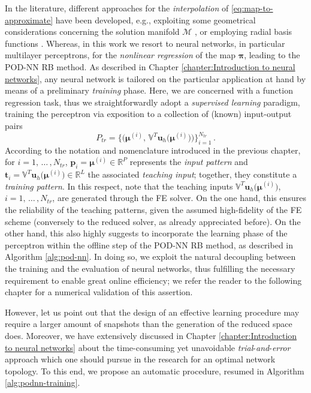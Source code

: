 \documentclass[12pt, a4paper, twoside, openright]{report}
\numberwithin{equation}{chapter}
\theoremstyle{theorem}
\theoremstyle{definition}
\theoremstyle{remark}
\theoremstyle{proposition}
\numberwithin{figure}{chapter}
\newcommand{\bg}[1]{\boldsymbol{#1}}
\begin{document}
		In the literature, different approaches for the \emph{interpolation} of \eqref{eq:map-to-approximate} have been developed, e.g., exploiting some geometrical considerations concerning the solution manifold $\mathcal{M}$ \cite{Ams10}, or employing radial basis functions \cite{Chen17}. Whereas, in this work we resort to neural networks, in particular multilayer perceptrons, for the \emph{nonlinear regression} of the map $\bg{\pi}$, leading to the POD-NN RB method. As described in Chapter \ref{chapter:Introduction to neural networks}, any neural network is tailored on the particular application at hand by means of a preliminary \emph{training} phase. Here, we are concerned with a function regression task, thus we straightforwardly adopt a \emph{supervised learning} paradigm, training the perceptron via exposition to a collection of (known) input-output pairs
		\begin{equation*}
			P_{tr} = \big\lbrace \big( \bg{\mu}^{(i)}, \, \mathbb{V}^T \mathbf{u}_h \big( \bg{\mu}^{(i)} \big) \big) \big\rbrace_{i = 1}^{N_{tr}} \, .
		\end{equation*} 
		According to the notation and nomenclature introduced in the previous chapter, for $i = 1, \, \ldots \, , N_{tr}$, $\mathbf{p}_i = \bg{\mu}^{(i)} \in \mathbb{R}^P$ represents the \emph{input pattern} and $\mathbf{t}_i =  \mathbb{V}^T \mathbf{u}_h \big( \bg{\mu}^{(i)} \big) \in \mathbb{R}^L$ the associated \emph{teaching input}; together, they constitute a \emph{training pattern}. In this respect, note that the teaching inputs $\mathbb{V}^T \mathbf{u}_h \big( \bg{\mu}^{(i)} \big)$, $i = 1, \, \ldots \, , N_{tr}$, are generated through the FE solver. On the one hand, this ensures the reliability of the teaching patterns, given the assumed high-fidelity of the FE scheme (conversely to the reduced solver, as already appreciated before). On the other hand, this also highly suggests to incorporate the learning phase of the perceptron within the offline step of the POD-NN RB method, as described in Algorithm \ref{alg:pod-nn}. In doing so, we exploit the natural decoupling between the training and the evaluation of neural networks, thus fulfilling the necessary requirement to enable great online efficiency; we refer the reader to the following chapter for a numerical validation of this assertion. 
		
		However, let us point out that the design of an effective learning procedure may require a larger amount of snapshots than the generation of the reduced space does. Moreover, we have extensively discussed in Chapter \ref{chapter:Introduction to neural networks} about the time-consuming yet unavoidable \emph{trial}-\emph{and}-\emph{error} approach which one should pursue in the research for an optimal network topology. To this end, we propose an automatic procedure, resumed in Algorithm \ref{alg:podnn-training}.
		
\end{document}
